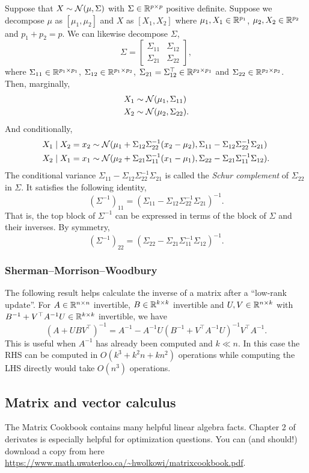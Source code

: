 Suppose that $X \sim {\mathcal N}(\mu,\Sigma)$ with $\Sigma \in \mathbb{R}^{p \times p}$ positive definite. Suppose we decompose $\mu$  as $[\mu_1,\mu_2]$ and $X$ as $[X_1,X_2]$ where $\mu_1,X_1 \in \mathbb{R}^{p_1}$, $\mu_2,X_2 \in \mathbb{R}^{p_2}$ and $p_1+p_2 = p$. We can likewise decompose $\Sigma$,
\[\Sigma = \begin{bmatrix}
    \Sigma_{11}&\Sigma_{12}\\
    \Sigma_{21}&\Sigma_{22}
\end{bmatrix}, \]
where $\Sigma_{11} \in \mathbb{R}^{p_1 \times p_1}$, $\Sigma_{12} \in \mathbb{R}^{p_1 \times p_2}$, $\Sigma_{21} =\Sigma_{12}^\top \in \mathbb{R}^{p_2 \times p_1}$ and $\Sigma_{22} \in \mathbb{R}^{p_2 \times p_2}$. Then, marginally,
\begin{align*}
    X_1 &\sim {\mathcal N}(\mu_1,\Sigma_{11})\\
    X_2 &\sim {\mathcal N}(\mu_2,\Sigma_{22}).
\end{align*}
And conditionally,
\begin{align*}
    X_1 \mid X_2 = x_2 & \sim {\mathcal N}(\mu_1 + \Sigma_{12}\Sigma_{22}^{-1}(x_2-\mu_2), \Sigma_{11} - \Sigma_{12}\Sigma_{22}^{-1}\Sigma_{21})\\
    X_2 \mid X_1 = x_1 & \sim {\mathcal N}(\mu_2 + \Sigma_{21}\Sigma_{11}^{-1}(x_1-\mu_1), \Sigma_{22} - \Sigma_{21}\Sigma_{11}^{-1}\Sigma_{12}).
\end{align*}
The conditional variance $\Sigma_{11} - \Sigma_{12}\Sigma_{22}^{-1}\Sigma_{21}$ is called the \emph{Schur complement} of $\Sigma_{22}$ in $\Sigma$. It satisfies the following identity,
\[(\Sigma^{-1})_{11} =  (\Sigma_{11} - \Sigma_{12}\Sigma_{22}^{-1}\Sigma_{21})^{-1}. \]
That is, the top block of $\Sigma^{-1}$ can be expressed in terms of the block of $\Sigma$ and their inverses. By symmetry,
\[ (\Sigma^{-1})_{22} =  (\Sigma_{22} - \Sigma_{21}\Sigma_{11}^{-1}\Sigma_{12})^{-1}.\]

\subsubsection*{Sherman--Morrison--Woodbury}

The following result helps calculate the inverse of a matrix after a ``low-rank update''. For $A \in \mathbb{R}^{n \times n}$ invertible, $B \in \mathbb{R}^{k \times k}$ invertible and $U,V \in \mathbb{R}^{n \times k}$ with $B^{-1}+V^\top A^{-1}U \in \mathbb{R}^{k \times k}$ invertible, we have
\[(A + UBV^\top)^{-1} =  A^{-1} - A^{-1}U\left(B^{-1}+V^\top A^{-1}U \right)^{-1}V^\top A^{-1}.\]
This is useful when $A^{-1}$ has already been computed and $k \ll n$. In this case the RHS can be computed in $O(k^3+k^2n+kn^2)$ operations while computing the LHS directly would take $O(n^3)$ operations. 

\subsection{Matrix and vector calculus}

The Matrix Cookbook contains many helpful linear algebra facts. Chapter 2 of derivates is especially helpful for optimization questions. You can (and should!) download a copy from here \url{https://www.math.uwaterloo.ca/~hwolkowi/matrixcookbook.pdf}. 

